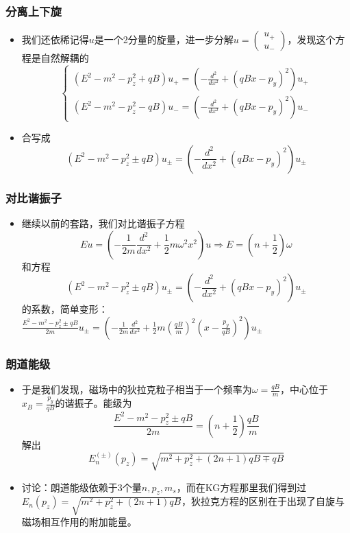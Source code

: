 \documentclass[aspectratio=1610,14pt,matheuler]{beamer}
\newcommand{\bch}{}
\newcommand{\ech}{}
\newcommand{\mat}[1]{\begin{pmatrix}#1\end{pmatrix}}
\begin{document}
\begin{frame}
\frametitle{\bch 分离上下旋 \ech}
\bch
\begin{itemize}
\item
我们还依稀记得$u$是一个2分量的旋量，进一步分解$u = \mat{u_+\\u_-}$，发现这个方程是自然解耦的
$$
\begin{cases}
(E^2 - m^2 -p_z^2 + qB)u_+ = \left(- \frac{d^2}{dx^2} +(qBx - p_y)^2\right) u_+ \\
(E^2 - m^2 -p_z^2 - qB)u_- = \left(- \frac{d^2}{dx^2} +(qBx - p_y)^2\right) u_-
\end{cases}
$$
\item 合写成
$$
(E^2 - m^2 -p_z^2 \pm qB)u_\pm = \left(- \frac{d^2}{dx^2} +(qBx - p_y)^2\right) u_\pm
$$
\end{itemize}
\ech
\end{frame}

\begin{frame}
\frametitle{\bch 对比谐振子 \ech}
\bch
\begin{itemize}
\item
继续以前的套路，我们对比谐振子方程
$$
Eu = \left(- \frac{1}{2m} \frac{d^2}{dx^2} + \frac{1}{2} m\omega^2 x^2\right)u \Rightarrow E= \left(n+\frac{1}{2}\right) \omega
$$
和方程
$$
(E^2 - m^2 -p_z^2 \pm qB)u_\pm = \left(- \frac{d^2}{dx^2} +(qBx - p_y)^2\right) u_\pm
$$
的系数，简单变形：
$
\frac{E^2 - m^2 -p_z^2 \pm qB}{2m} u_\pm = \left(- \frac{1}{2m} \frac{d^2}{dx^2} +\frac{1}{2} m\left(\frac{qB}{m}\right)^2\left(x - \frac{p_y}{qB}\right)^2\right) u_\pm
$
\end{itemize}
\ech
\end{frame}

\begin{frame}
\frametitle{\bch 朗道能级 \ech}
\bch
\begin{itemize}
\item
于是我们发现，磁场中的狄拉克粒子相当于一个频率为$\omega = \frac{qB}{m}$，中心位于$x_B = \frac{p_y}{qB}$的谐振子。能级为
$$
\frac{E^2 - m^2 -p_z^2 \pm qB}{2m} = \left(n+ \frac{1}{2}\right) \frac{qB}{m}
$$
解出
$$
E^{(\pm)}_n(p_z) = \sqrt{m^2 + p_z^2 + (2n+1)qB \mp qB}
$$
\item
讨论：朗道能级依赖于3个量$n,p_z,m_s$，而在KG方程那里我们得到过$E_n(p_z) = \sqrt{m^2 + p_z^2 + (2n+1)qB}$，{\color{blue}狄拉克方程的区别在于出现了自旋与磁场相互作用的附加能量}。
\end{itemize}
\ech
\end{frame}
\end{document}
